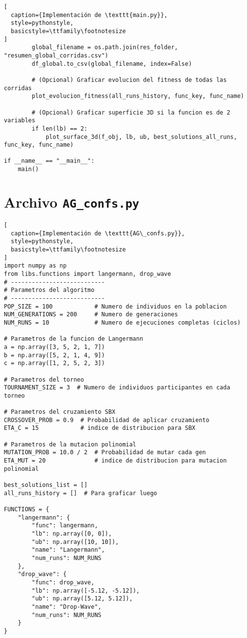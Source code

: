 \begin{lstlisting}[
  caption={Implementación de \texttt{main.py}},
  style=pythonstyle,
  basicstyle=\ttfamily\footnotesize
]
        global_filename = os.path.join(res_folder, "resumen_global_corridas.csv")
        df_global.to_csv(global_filename, index=False)
        
        # (Opcional) Graficar evolucion del fitness de todas las corridas
        plot_evolucion_fitness(all_runs_history, func_key, func_name)
        
        # (Opcional) Graficar superficie 3D si la funcion es de 2 variables
        if len(lb) == 2:
            plot_surface_3d(f_obj, lb, ub, best_solutions_all_runs, func_key, func_name)

if __name__ == "__main__":
    main()

\end{lstlisting}

\section{Archivo \texttt{AG\_confs.py}}
\begin{lstlisting}[
  caption={Implementación de \texttt{AG\_confs.py}},
  style=pythonstyle,
  basicstyle=\ttfamily\footnotesize
]
import numpy as np
from libs.functions import langermann, drop_wave
# ---------------------------
# Parametros del algoritmo
# ---------------------------
POP_SIZE = 100            # Numero de individuos en la poblacion
NUM_GENERATIONS = 200     # Numero de generaciones
NUM_RUNS = 10             # Numero de ejecuciones completas (ciclos)

# Parametros de la funcion de Langermann
a = np.array([3, 5, 2, 1, 7])
b = np.array([5, 2, 1, 4, 9])
c = np.array([1, 2, 5, 2, 3])

# Parametros del torneo
TOURNAMENT_SIZE = 3  # Numero de individuos participantes en cada torneo

# Parametros del cruzamiento SBX
CROSSOVER_PROB = 0.9  # Probabilidad de aplicar cruzamiento
ETA_C = 15            # indice de distribucion para SBX

# Parametros de la mutacion polinomial
MUTATION_PROB = 10.0 / 2  # Probabilidad de mutar cada gen
ETA_MUT = 20              # indice de distribucion para mutacion polinomial

best_solutions_list = [] 
all_runs_history = []  # Para graficar luego

FUNCTIONS = {
    "langermann": {
        "func": langermann,
        "lb": np.array([0, 0]),
        "ub": np.array([10, 10]),
        "name": "Langermann",
        "num_runs": NUM_RUNS
    },
    "drop_wave": {
        "func": drop_wave,
        "lb": np.array([-5.12, -5.12]),
        "ub": np.array([5.12, 5.12]),
        "name": "Drop-Wave",
        "num_runs": NUM_RUNS
    }
}
\end{lstlisting}

